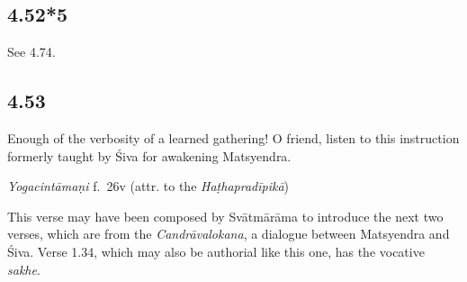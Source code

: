 \begin{ekdosis}
\subsection*{4.52*5}



\begin{philcomm}[hp04_052_5]
See 4.74.
\end{philcomm}

\subsection*{4.53}
\begin{translation}[hp04_053]
Enough of the verbosity of a learned gathering! O friend, listen to this instruction formerly taught by Śiva for awakening Matsyendra.
\end{translation}



\begin{testimonia}[hp04_053]
\emph{Yogacintāmaṇi} f.~26v (attr. to the \emph{Haṭhapradīpikā})
\begin{versinnote}
\end{versinnote}
\end{testimonia}

\begin{philcomm}[hp04_053]
This verse may have been composed by Svātmārāma to introduce the next two verses, which are from the \emph{Candrāvalokana}, a dialogue between Matsyendra and Śiva. Verse 1.34, which may also be authorial like this one, has the vocative \emph{sakhe}.
\end{philcomm}


\end{ekdosis}

